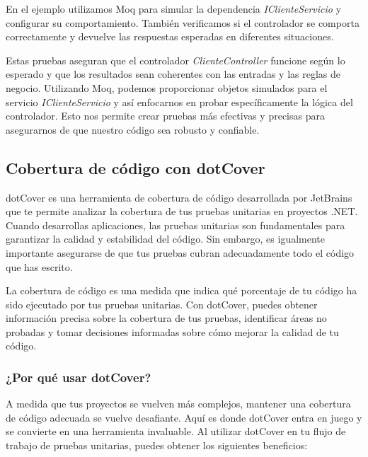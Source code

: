 \documentclass[executivepaper]{article}
\begin{document}
En el ejemplo utilizamos Moq para simular la dependencia \emph{IClienteServicio} y configurar su comportamiento. También verificamos si el controlador se comporta correctamente y devuelve las respuestas esperadas en diferentes situaciones.

Estas pruebas aseguran que el controlador \emph{ClienteController} funcione según lo esperado y que los resultados sean coherentes con las entradas y las reglas de negocio. Utilizando Moq, podemos proporcionar objetos simulados para el servicio \emph{IClienteServicio} y así enfocarnos en probar específicamente la lógica del controlador. Esto nos permite crear pruebas más efectivas y precisas para asegurarnos de que nuestro código sea robusto y confiable.

\subsection{Cobertura de código con dotCover}

dotCover es una herramienta de cobertura de código desarrollada por JetBrains que te permite analizar la cobertura de tus pruebas unitarias en proyectos .NET. Cuando desarrollas aplicaciones, las pruebas unitarias son fundamentales para garantizar la calidad y estabilidad del código. Sin embargo, es igualmente importante asegurarse de que tus pruebas cubran adecuadamente todo el código que has escrito.

La cobertura de código es una medida que indica qué porcentaje de tu código ha sido ejecutado por tus pruebas unitarias. Con dotCover, puedes obtener información precisa sobre la cobertura de tus pruebas, identificar áreas no probadas y tomar decisiones informadas sobre cómo mejorar la calidad de tu código.

\subsubsection*{¿Por qué usar dotCover?}

A medida que tus proyectos se vuelven más complejos, mantener una cobertura de código adecuada se vuelve desafiante. Aquí es donde dotCover entra en juego y se convierte en una herramienta invaluable. Al utilizar dotCover en tu flujo de trabajo de pruebas unitarias, puedes obtener los siguientes beneficios:
\end{document}
